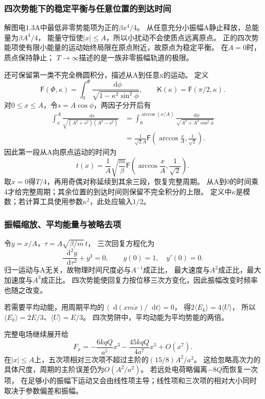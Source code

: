 \documentclass[UTF8,fontset=fandol,a4paper,11pt]{ctexart}
\newcommand{\dd}{\mathop{}\!\mathrm{d}}
\begin{document}
\subsubsection*{四次势能下的稳定平衡与任意位置的到达时间}
解图电1.3A中最低非零势能项为正的$\beta x^4/4$。
从任意充分小振幅A静止释放，总能量为$\beta A^4/4$，
能量守恒使$|x|\le A$，所以小扰动不会使质点远离原点。
正的四次势能项使有限小能量的运动始终局限在原点附近，故原点为稳定平衡。
在$A=0$时，质点保持静止；
$T\to\infty$描述的是一族非零振幅轨道的极限。

还可保留第一类不完全椭圆积分，描述从A到任意x的运动。
定义
\[
\mathsf F(\Phi,\kappa)=\int_0^\Phi
\frac{\dd\phi}{\sqrt{1-\kappa^2\sin^2\phi}},\qquad
\mathsf K(\kappa)=\mathsf F(\pi/2,\kappa).
\]
对$0\le x\le A$，令$s=A\cos\phi$，两因子分开后有
\[
\begin{aligned}
\int_x^A\frac{\dd s}{\sqrt{(A^2+s^2)(A^2-s^2)}}
&=\int_0^{\arccos(x/A)}\frac{\dd\phi}{\sqrt{A^2+A^2\cos^2\phi}}\\
&=\frac1{\sqrt2A}\mathsf F\left(\arccos\frac xA,\frac1{\sqrt2}\right).
\end{aligned}
\]
因此第一段从A向原点运动的时间为
\[
t(x)=\frac1A\sqrt{\frac m\beta}
\mathsf F\left(\arccos\frac xA,\frac1{\sqrt2}\right).
\]
取$x=0$得$T/4$，再用奇偶对称延续到其余三段，恢复完整周期。
从A到0的时间乘4才给完整周期；其余位置的到达时间则保留不完全积分的上限。
定义中$\kappa$是模数；若计算工具使用参数$\kappa^2$，此处应输入$1/2$。

\subsubsection*{振幅缩放、平均能量与被略去项}
令$y=x/A$，$\tau=A\sqrt{\beta/m}\,t$，
三次回复方程化为
\[
\frac{\dd^2y}{\dd\tau^2}+y^3=0,\qquad
y(0)=1,\quad y'(0)=0.
\]
归一运动与A无关，故物理时间尺度必与$A^{-1}$成正比，
最大速度与$A^2$成正比，最大加速度与$A^3$成正比。
四次势能使回复力按位移三次方变化，因此振幅改变时频率也随之改变。

若需要平均动能，用周期平均的
$\langle\dd(xm\dot x)/\dd t\rangle=0$，
得$2\langle E_k\rangle=4\langle U\rangle$，
所以$\langle E_k\rangle=2E/3$、$\langle U\rangle=E/3$。
四次势阱中，平均动能为平均势能的两倍。

完整电场继续展开给
\[
F_x=-\frac{6kqQ}{a^5}x^3
-\frac{45kqQ}{4a^7}x^5+O(x^7).
\]
在$|x|\le A$上，五次项相对三次项不超过主阶的$(15/8)A^2/a^2$。
这给忽略高次力的具体尺度，周期的主阶误差仍为$O(A^2/a^2)$。
若远处电荷略偏离$-8Q$而恢复一次项，
在足够小的振幅下运动又会由线性项主导；线性项和三次项的相对大小同时取决于参数偏差和振幅。
\end{document}
